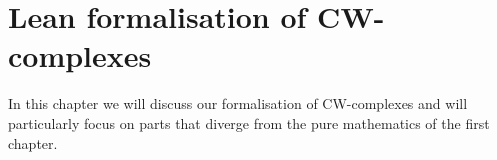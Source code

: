 \chapter{Lean formalisation of CW-complexes}

In this chapter we will discuss our formalisation of CW-complexes and will particularly focus on parts that diverge from the pure mathematics of the first chapter. 

